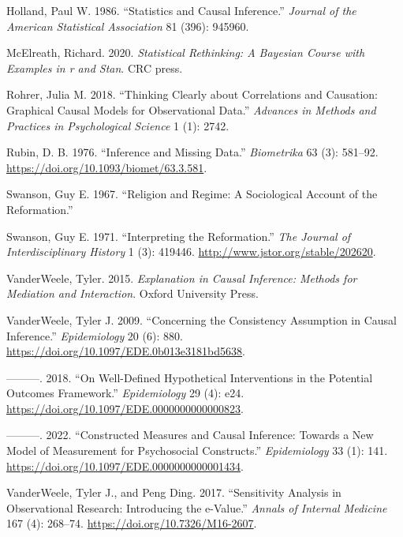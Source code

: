 \documentclass[
  singlecolumn]{report}
\newlength{\cslhangindent}
\newlength{\cslentryspacingunit} %
\newenvironment{CSLReferences}[2] %
 {%
  \setlength{\parindent}{0pt}
  \ifodd #1
  \let\oldpar\par
  \def\par{\hangindent=\cslhangindent\oldpar}
  \fi
  \setlength{\parskip}{#2\cslentryspacingunit}
 }%
 {}
\begin{document}
\begin{CSLReferences}{1}{0}
\leavevmode{}%
Holland, Paul W. 1986. {``Statistics and Causal Inference.''}
\emph{Journal of the American Statistical Association} 81 (396): 945960.

\leavevmode{}%
McElreath, Richard. 2020. \emph{Statistical Rethinking: A Bayesian
Course with Examples in r and Stan}. CRC press.

\leavevmode{}%
Rohrer, Julia M. 2018. {``Thinking Clearly about Correlations and
Causation: Graphical Causal Models for Observational Data.''}
\emph{Advances in Methods and Practices in Psychological Science} 1 (1):
2742.

\leavevmode{}%
Rubin, D. B. 1976. {``Inference and Missing Data.''} \emph{Biometrika}
63 (3): 581--92. \url{https://doi.org/10.1093/biomet/63.3.581}.

\leavevmode{}%
Swanson, Guy E. 1967. {``Religion and Regime: A Sociological Account of
the Reformation.''}

\leavevmode{}%
Swanson, Guy E. 1971. {``Interpreting the Reformation.''} \emph{The
Journal of Interdisciplinary History} 1 (3): 419446.
\url{http://www.jstor.org/stable/202620}.

\leavevmode{}%
VanderWeele, Tyler. 2015. \emph{Explanation in Causal Inference: Methods
for Mediation and Interaction}. Oxford University Press.

\leavevmode{}%
VanderWeele, Tyler J. 2009. {``Concerning the Consistency Assumption in
Causal Inference.''} \emph{Epidemiology} 20 (6): 880.
\url{https://doi.org/10.1097/EDE.0b013e3181bd5638}.

\leavevmode{}%
---------. 2018. {``On Well-Defined Hypothetical Interventions in the
Potential Outcomes Framework.''} \emph{Epidemiology} 29 (4): e24.
\url{https://doi.org/10.1097/EDE.0000000000000823}.

\leavevmode{}%
---------. 2022. {``Constructed Measures and Causal Inference: Towards a
New Model of Measurement for Psychosocial Constructs.''}
\emph{Epidemiology} 33 (1): 141.
\url{https://doi.org/10.1097/EDE.0000000000001434}.

\leavevmode{}%
VanderWeele, Tyler J., and Peng Ding. 2017. {``Sensitivity Analysis in
Observational Research: Introducing the e-Value.''} \emph{Annals of
Internal Medicine} 167 (4): 268--74.
\url{https://doi.org/10.7326/M16-2607}.


\end{CSLReferences}
\end{document}
